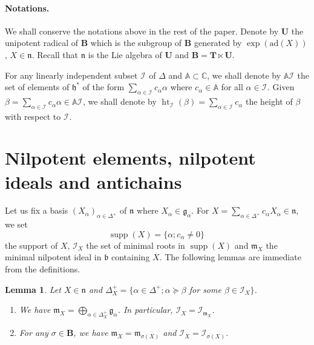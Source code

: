 \documentclass[10pt,a4paper]{amsart}
\newcommand{\supp}{\mathop{\mathrm{supp}}\nolimits}
\newcommand{\height}{\mathop{\mathrm{ht}}\nolimits}
\newcommand{\soc}[1]{\mathcal{I}_{#1}}
\newcommand{\group}[1]{\mathbf{#1}}
\numberwithin{equation}{section}
\theoremstyle{plain}
\newtheorem{lemma}[theorem]{Lemma}
\theoremstyle{definition}
\theoremstyle{remark}
\begin{document}
\paragraph{Notations.} We shall conserve the notations above in the rest of the paper. Denote by 
$\group{U}$ the unipotent radical of $\group{B}$ which is the subgroup of $\group{B}$ generated by 
$\exp (\mathrm{ad} (X) )$, 
$X\in \mathfrak{n}$. Recall that $\mathfrak{n}$ is the Lie algebra of $\group{U}$ and 
$\group{B} = \group{T} \ltimes \group{U}$.

For any linearly independent subset $\soc{}$ of $\Delta$ and 
$\mathbb{A} \subset \mathbb{C}$, we shall denote by 
$\mathbb{A} \soc{}$ the set of elements of $\mathfrak{h}^{*}$ of the form
$\sum_{\alpha\in \soc{}} c_{\alpha} \alpha$ where $c_{\alpha} \in \mathbb{A}$ for all $\alpha\in\soc{}$.
Given $\beta =  \sum_{\alpha\in \soc{}} c_{\alpha} \alpha \in \mathbb{A} \soc{}$, we shall denote by 
$\height_{\soc{}} (\beta ) =\sum_{\alpha\in \soc{}} c_{\alpha}$ the height of $\beta$ with respect to 
$\soc{}$.

\section{Nilpotent elements, nilpotent ideals and antichains}\label{sec:socle}

Let us fix a basis $(X_{\alpha})_{\alpha\in\Delta^{+}}$ of $\mathfrak{n}$ where 
$X_{\alpha}\in \mathfrak{g}_{\alpha}$.
For $X = \sum_{\alpha\in \Delta^{+}} c_{\alpha} X_{\alpha} \in\mathfrak{n}$, we set 
$$
\supp (X) = \{ \alpha ; c_{\alpha} \neq 0\} \ 
$$
the support of $X$, $\soc{X}$ the set of minimal roots in $\supp(X)$ and $\mathfrak{m}_{X}$ 
the minimal nilpotent ideal in $\mathfrak{b}$ containing $X$.
The following lemmas are immediate from the definitions.

\begin{lemma}\label{socle-element}
Let $X\in \mathfrak{n}$ and $\Delta_{X}^{+} 
= \{ \alpha \in \Delta^{+} ; \alpha \succcurlyeq \beta$ for some 
$\beta\in \soc{X} \}$.
\begin{enumerate}
\item We have $\mathfrak{m}_{X} = \bigoplus_{\alpha\in \Delta_{X}^{+}} \mathfrak{g}_{\alpha}$.
In particular, $\soc{X} = \soc{\mathfrak{m}_{X}}$.
\item For any $\sigma \in \group{B}$, we have $\mathfrak{m}_{X} = \mathfrak{m}_{\sigma ( X )}$ and 
$\soc{X}=\soc{\sigma( X )}$.
\end{enumerate}
\end{lemma}
\end{document}
